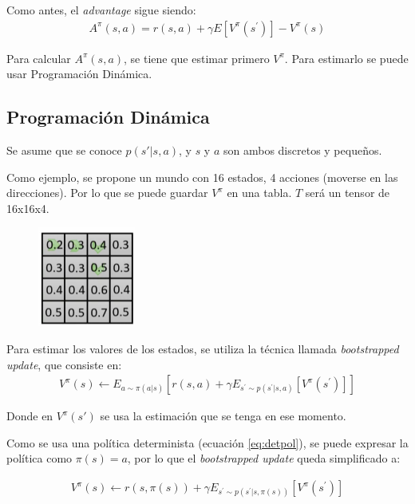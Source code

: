 Como antes, el \textit{advantage} sigue siendo:
\begin{align}
    \label{eq:advantage}
A ^ { \pi } ( s , a ) = r ( s , a ) + \gamma E [ V ^ { \pi } ( s ^ { \prime } ) ] - V ^ { \pi } ( s )
\end{align}

Para calcular $A^\pi(s,a)$, se tiene que estimar primero  $V^\pi$. Para estimarlo se puede usar
Programación Dinámica.

\subsection{Programación Dinámica}%
\label{sub:programación_dinámica}

Se asume que se conoce $p(s'|s,a)$, y  $s$ y $a$ son ambos discretos y pequeños.

Como ejemplo, se propone un mundo con 16 estados, 4 acciones (moverse en las direcciones). Por lo que se puede guardar
$V^\pi$ en una tabla.  $T$ será un tensor de 16x16x4.

\begin{figure}[htpb]
	\centering
	\includegraphics[width=0.15\linewidth]{figures/2020-06-15-110633_121x124_scrot.png}
\end{figure}

Para estimar los valores de los estados, se utiliza la técnica llamada \textit{bootstrapped
update}, que consiste en:
\begin{align}
V ^ { \pi } ( s ) \leftarrow E _ { a \sim \pi ( a | s ) } [ r ( s , a ) + \gamma E _ { s ^ { \prime } \sim p ( s ^ { \prime } | s , a ) } [ V ^ { \pi } ( s ^ { \prime } ) ] ]
\end{align}

Donde en $V^\pi(s')$ se usa la estimación que se tenga en ese momento.

Como se usa una política determinista (ecuación \ref{eq:detpol}), se puede expresar la política
como $\pi(s)=a$, por lo que el \textit{bootstrapped update} queda simplificado a:

\begin{align}
V ^ { \pi } ( s ) \leftarrow r ( s , \pi ( s ) ) + \gamma E _ { s ^ { \prime } \sim p ( s ^ { \prime } | s , \pi ( s ) ) } [ V ^ { \pi } ( s ^ { \prime } ) ]
\end{align}


